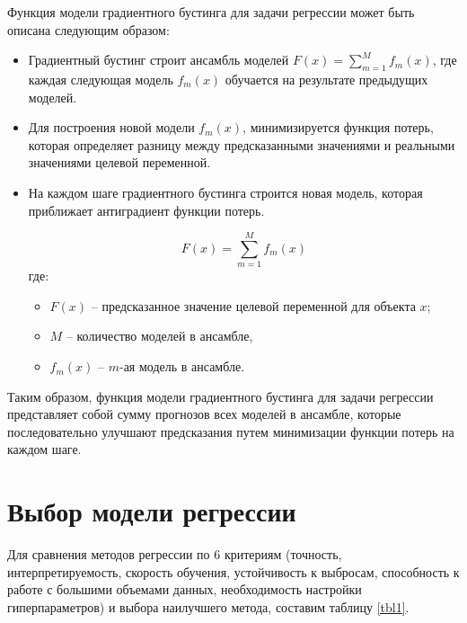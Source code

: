 Функция модели градиентного бустинга для задачи регрессии может быть описана следующим образом:
\begin{itemize}
    \item Градиентный бустинг строит ансамбль моделей $F(x) = \sum_{m=1}^M f_m(x)$, где каждая следующая модель $f_m(x)$ обучается на результате предыдущих моделей.
    \item Для построения новой модели $f_m(x)$, минимизируется функция потерь, которая определяет разницу между предсказанными значениями и реальными значениями целевой переменной.
    \item На каждом шаге градиентного бустинга строится новая модель, которая приближает антиградиент функции потерь.
    
    \begin{equation}
        F(x) = \sum_{m=1}^M f_m(x)
    \end{equation}
    где:
    \begin{itemize}
        \item $F(x)$ -- предсказанное значение целевой переменной для объекта $x$;
        \item $M$ -- количество моделей в ансамбле,
        \item $f_m(x)$ -- $m$-ая модель в ансамбле.
    \end{itemize}
\end{itemize}

Таким образом, функция модели градиентного бустинга для задачи регрессии представляет собой сумму прогнозов всех моделей в ансамбле, которые последовательно улучшают предсказания путем минимизации функции потерь на каждом шаге.


\section{Выбор модели регрессии}
Для сравнения методов регрессии по 6 критериям (точность, интерпретируемость, скорость обучения, устойчивость к выбросам, способность к работе с большими объемами данных, необходимость настройки гиперпараметров) и выбора наилучшего метода, составим таблицу \ref{tbl1}.

